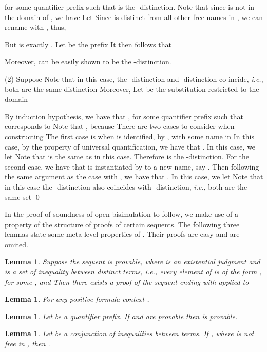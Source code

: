 \documentclass{acmtrans2m}
\newtheorem{lemma}[theorem]{Lemma}
\newcommand{\ie}{{\em i.e.}}
\begin{document}
for some quantifier prefix  such that
 is the -distinction.
Note that since  is not in the domain of , 
we have 
Let  Since  is distinct from all other free names in
, we can rename  with , thus, 

But  is exactly . Let  be the
prefix  It then follows that 

Moreover,  can be easily shown to be the -distinction.

\noindent(2) Suppose 
Note that in this case, the -distinction and
-distinction co-incide, \ie, both are the same
distinction  Moreover, 
Let  be the substitution  restricted to the domain

By induction hypothesis, we have that 
,
for some quantifier prefix  
such that  corresponds to 
Note that , because 
There are two cases to consider when constructing 
The first case is when  is identified, by , with
some name in  In this case, by the property of 
universal quantification, we have that 
.
In this case, we let 
Note that  is the same as  in this case.
Therefore  is the -distinction. 
For the second case, we have that  is instantiated by 
to a new name, say . 
Then following the same argument as the case with , we have that
.
In this case, we let 
Note that in this case the -distinction also coincides
with -distinction, \ie, both are the same set
 \qed


In the proof of soundness of open bisimulation to follow, we make use of
a property of the structure of proofs of certain sequents. 
The following three lemmas state some meta-level properties of .
Their proofs are easy and are omited.

\begin{lemma}
\label{lm:distinction}
Suppose the sequent  is provable, where  is an existential
judgment and  is a set of inequality between distinct terms, \ie, every element of
 is of the form , for some ,  and 
Then there exists a proof of the sequent ending with  applied to 
\end{lemma}

\begin{lemma}
\label{lm:context}
For any positive formula context ,  
\end{lemma}

\begin{lemma}
\label{lm:modus ponens}
Let  be a quantifier prefix. 
If  and 
 are provable 
then  is provable.
\end{lemma}


\begin{lemma}
\label{lm:nabla distinction}
Let  be a conjunction of inequalities between terms.
If , where  is not free in , 
then  .
\end{lemma}
\end{document}
